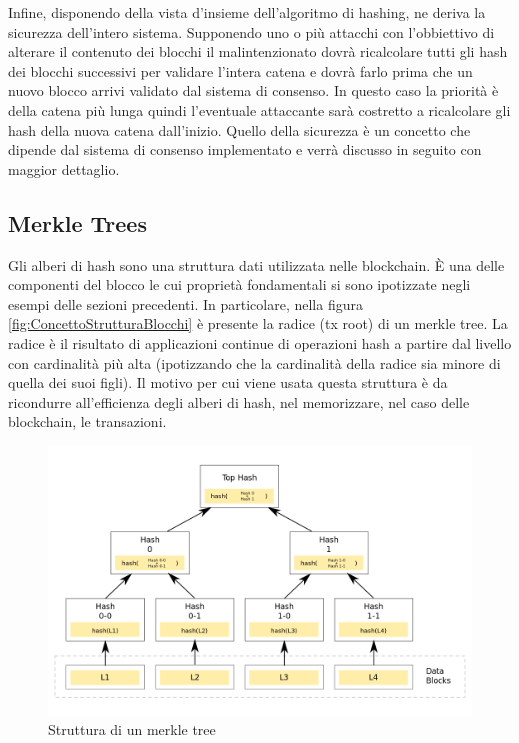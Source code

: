 Infine, disponendo della vista d'insieme dell'algoritmo di hashing, ne deriva la sicurezza dell'intero sistema. Supponendo uno o più attacchi con l'obbiettivo di alterare il contenuto dei blocchi il malintenzionato dovrà ricalcolare tutti gli hash dei blocchi successivi per validare l'intera catena e dovrà farlo prima che un nuovo blocco arrivi validato dal sistema di consenso. In questo caso la priorità è della catena più lunga quindi l’eventuale attaccante sarà costretto a ricalcolare gli hash della nuova catena dall’inizio. Quello della sicurezza è un concetto che dipende dal sistema di consenso implementato e verrà discusso in seguito con maggior dettaglio.

\subsection{Merkle Trees}

Gli alberi di hash sono una struttura dati utilizzata nelle blockchain. È una delle componenti del blocco le cui proprietà fondamentali si sono ipotizzate negli esempi delle sezioni precedenti. In particolare, nella figura \ref{fig:ConcettoStrutturaBlocchi} è presente la radice (tx root) di un merkle tree. La radice è il risultato di applicazioni continue di operazioni hash a partire dal livello con cardinalità più alta (ipotizzando che la cardinalità della radice sia minore di quella dei suoi figli). Il motivo per cui viene usata questa struttura è da ricondurre all'efficienza degli alberi di hash, nel memorizzare, nel caso delle blockchain, le transazioni. 


\begin{figure}[H]
\centering
\includegraphics[width=1\textwidth]{immagini/hash_Trees.png}
\caption{Struttura di un merkle tree}
\label{fig:MerkleTreeStruttura}

\end{figure}

